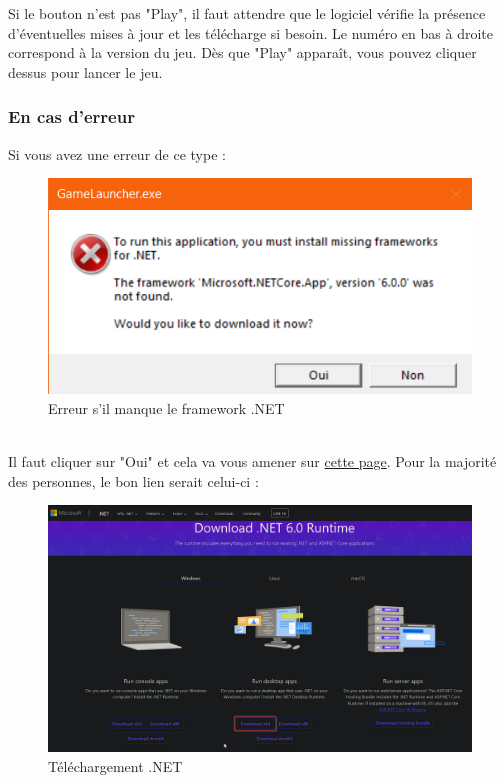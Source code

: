 \documentclass[a4paper, 12pt]{article}
\begin{document}
	Si le bouton n'est pas "Play", il faut attendre que le logiciel vérifie la présence d'éventuelles mises à jour et les télécharge si besoin. Le numéro en bas à droite correspond à la version du jeu. Dès que "Play" apparaît, vous pouvez cliquer dessus pour lancer le jeu.
	
	\subsubsection{En cas d'erreur}
	Si vous avez une erreur de ce type : 
	\begin{figure}[ht]
		\centering
		\includegraphics[scale=0.5]{images/erreur.png}
		\caption{Erreur s'il manque le framework .NET}
	\end{figure}
	\\
	Il faut cliquer sur "Oui" et cela va vous amener sur \href{https://dotnet.microsoft.com/en-us/download/dotnet/6.0/runtime?cid=getdotnetcore}{cette page}.
	Pour la  majorité des personnes, le bon lien serait celui-ci : 
	\clearpage
	\begin{figure}[h!]
		\centering
		\includegraphics[scale=0.4]{images/dotnet.png}
		\caption{Téléchargement .NET}
	\end{figure}
	
\end{document}
